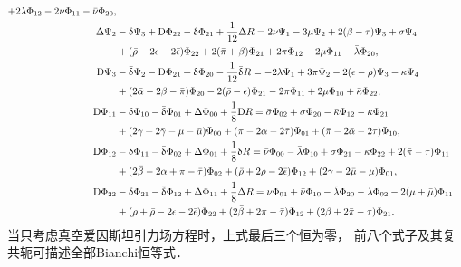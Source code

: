 \begin{subequations}
\begin{align}
        +2\lambda \Phi_{12}-2\nu\Phi_{11}-\bar{\nu}\Phi_{20}, \\
        \Delta \Psi_{2}&-\updelta \Psi_{3}  +{\rm D} \Phi_{22} -\updelta \Phi_{21}
        +\frac{1}{12}{\Delta}R =2\nu \Psi_{1}-3\mu \Psi_{2}+2(\beta -\tau )
        \Psi_{3}+\sigma \Psi_{4} \notag\\
        &+(\bar{\rho}-2\epsilon-2\bar{\epsilon})\Phi_{22}+2(\bar{\pi}+\beta)\Phi_{21}
        +2\pi\Phi_{12} -2\mu \Phi_{11} -\bar{\lambda}\Phi_{20},  \\
        {\rm D}\Psi_{3}&-\bar{\updelta }\Psi_{2} - {\rm D} \Phi_{21} + \updelta \Phi_{20}
        -\frac{1}{12}\bar{\updelta}R =-2\lambda \Psi_{1} + 3\pi \Psi_{2}
        -2(\epsilon -\rho )\Psi_{3} -\kappa \Psi_{4} \notag\\
        &+(2\bar{\alpha}-2\beta-\bar{\pi})\Phi_{20} - 2(\bar{\rho}-\epsilon)\Phi_{21}
        -2\pi\Phi_{11}+2\mu\Phi_{10} + \bar{\kappa}\Phi_{22}, \\
        {\rm D} \Phi_{11}&-\updelta \Phi_{10} - \bar{\updelta} \Phi_{01} + {\Delta} \Phi_{00}
        +\frac{1}{8}{\rm D}R = \bar{\sigma}\Phi_{02} +\sigma\Phi_{20}
        -\bar{\kappa}\Phi_{12} - \kappa \Phi_{21} \notag \\
        & +(2\gamma+2\bar{\gamma} -\mu-\bar{\mu})\Phi_{00} +(\pi-2\alpha -2\bar{\tau})\Phi_{01}
        + (\bar{\pi}-2\bar{\alpha}-2\tau)\Phi_{10},  \\
        {\rm D} \Phi_{12}&-\updelta \Phi_{11} - \bar{\updelta} \Phi_{02} + {\Delta} \Phi_{01}
        +\frac{1}{8}{\updelta}R = \bar{\nu}\Phi_{00} - \bar{\lambda}\Phi_{10}
        +{\sigma}\Phi_{21} - \kappa \Phi_{22} +2(\bar{\pi}-\tau)\Phi_{11} \notag \\
        & +(2\bar{\beta} -2\alpha +\pi-\bar{\tau})\Phi_{02}
        +(\bar{\rho}+2\rho -2\bar{\epsilon})\Phi_{12}
        +(2\gamma-2\bar{\mu}-\mu)\Phi_{01},  \\
        {\rm D} \Phi_{22}&-\updelta \Phi_{21} - \bar{\updelta} \Phi_{12} + {\Delta} \Phi_{11}
        +\frac{1}{8}{\Delta}R = {\nu}\Phi_{01} +\bar{\nu}\Phi_{10} -\bar{\lambda}\Phi_{20}
        -{\lambda}\Phi_{02} -2(\mu +\bar{\mu})\Phi_{11} \notag \\
        & +(\rho+\bar{\rho} - 2\epsilon-2\bar{\epsilon})\Phi_{22}
        +(2\bar{\beta}+2\pi -\bar{\tau})\Phi_{12}
        +(2{\beta}+2\bar{\pi} -{\tau})\Phi_{21} .
    \end{align}
\end{subequations} %
当只考虑真空爱因斯坦引力场方程时，上式最后三个恒为零，
前八个式子及其复共轭可描述全部Bianchi恒等式．










